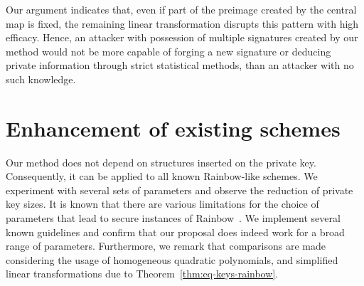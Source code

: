 \documentclass[12pt, a4paper, oneside]{memoir}
\theoremstyle{definition}
\begin{document}
Our argument indicates that, even if part of the preimage created by the central map is fixed, the remaining linear transformation disrupts this pattern with high efficacy. Hence, an attacker with possession of multiple signatures created by our method would not be more capable of forging a new signature or deducing private information through strict statistical methods, than an attacker with no such knowledge.

\section{Enhancement of existing schemes}\label{sec:exp}

Our method does not depend on structures inserted on the private key. Consequently, it can be applied to all known Rainbow-like schemes. We experiment with several sets of parameters and observe the reduction of private key sizes. It is known that there are various limitations for the choice of parameters that lead to secure instances of Rainbow~\cite{Petzoldt:201005}. We implement several known guidelines and confirm that our proposal does indeed work for a broad range of parameters. Furthermore, we remark that comparisons are made considering the usage of homogeneous quadratic polynomials, and simplified linear transformations due to Theorem~\ref{thm:eq-keys-rainbow}.
\end{document}
